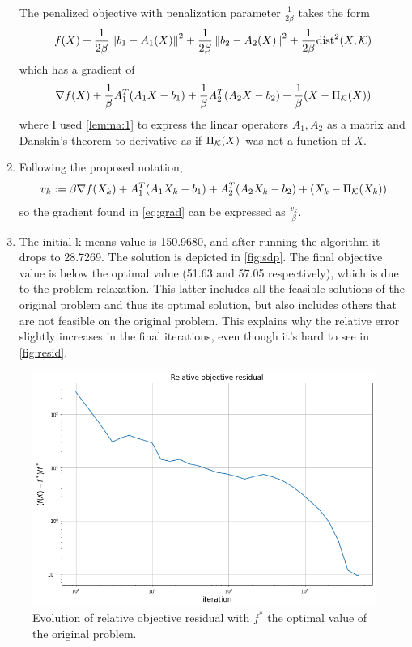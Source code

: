 \documentclass{article}
\begin{document}
\begin{enumerate}[label=(\alph*)]
    The penalized objective with penalization parameter $\frac{1}{2\beta}$ takes the form
    \begin{align}
        f(X)+\frac{1}{2\beta}\left\lVert b_1-A_1(X)\right\rVert^2+\frac{1}{2\beta}\left\lVert b_2-A_2(X)\right\rVert^2+\frac{1}{2\beta}\text{dist}^2(X,\mathcal{K})
    \end{align}
    which has a gradient of
    \begin{align}
        \nabla f(X) +\frac{1}{\beta}A_1^T(A_1X -b_1)+\frac{1}{\beta}A_2^T(A_2X-b_2)+\frac{1}{\beta}(X - \Pi_{\mathcal{K}}(X))
        \label{eq:grad}
    \end{align}
    where I used \autoref{lemma:1} to express the linear operators $A_1,A_2$ as a matrix and Danskin's theorem to derivative as if $\Pi_{\mathcal{K}}(X)$ was not a function of $X$.
    \item Following the proposed notation,
    \begin{align}
        v_k := \beta \nabla f(X_k) +A_1^T(A_1X_k -b_1)+A_2^T(A_2X_k-b_2)+(X_k - \Pi_{\mathcal{K}}(X_k))
    \end{align}
    so the gradient found in \eqref{eq:grad} can be expressed as $\frac{v_k}{\beta}$.
    \item The initial k-means value is 150.9680, and after running the algorithm it drops to 28.7269. The solution is depicted in \autoref{fig:sdp}. The final objective value is below the optimal value (51.63 and 57.05 respectively), which is due to the problem relaxation. This latter includes all the feasible solutions of the original problem and thus its optimal solution, but also includes others that are not feasible on the original problem. This explains why the relative error slightly increases in the final iterations, even though it's hard to see in \autoref{fig:resid}.
\end{enumerate}

\begin{figure}[ht]
    \centering
    \includegraphics[width=.5\textwidth]{4-frank_wolfe/part3/residual.png}
    \caption{Evolution of relative objective residual with $f^*$ the optimal value of the original problem.}
    \label{fig:resid}
\end{figure}
\end{document}
